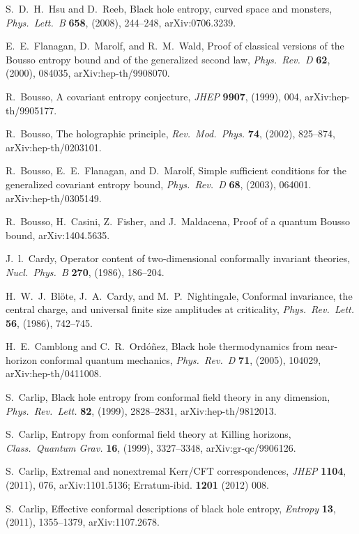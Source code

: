\documentclass[11pt]{article}
\begin{document}
\begin{thebibliography}{999}
 S.~D.~H.\ Hsu and D.\ Reeb, Black hole entropy, 
curved space and monsters, \emph{Phys.\ Lett.\ B} {\bf 658}, 
(2008), 244--248, arXiv:0706.3239. 

 E.~E.\ Flanagan, D.\ Marolf, and R.~M.\ Wald,
Proof of classical versions of the Bousso entropy bound and of the 
generalized second law, \emph{Phys.\ Rev.\ D} {\bf 62}, (2000),
084035, arXiv:hep-th/9908070.

 R.\ Bousso, A covariant entropy conjecture,
\emph{JHEP} {\bf 9907}, (1999), 004, arXiv:hep-th/9905177.

 R.\ Bousso, The holographic principle, 
\emph{Rev.\ Mod.\ Phys.} {\bf 74}, (2002),  825--874, 
arXiv:hep-th/0203101.

 R.\ Bousso, E.~E.\ Flanagan, and D.\ Marolf,
Simple sufficient conditions for the generalized covariant 
entropy bound, \emph{Phys.\ Rev.\ D} {\bf 68}, (2003), 064001.
arXiv:hep-th/0305149.

 R.\ Bousso, H.\ Casini, Z.\ Fisher, and 
J.\ Maldacena, Proof of a quantum Bousso bound, arXiv:1404.5635.

 J.~l.\ Cardy, Operator content of two-dimensional 
conformally invariant theories, \emph{Nucl.\ Phys.\ B} {\bf 270}, 
(1986), 186--204.

  H.~W.~J.\ Bl{\"o}te, J.~A.\ Cardy, and M.~P.\ 
Nightingale, Conformal invariance, the central charge, and 
universal finite size amplitudes at criticality, \emph{Phys.\ Rev.\ 
Lett.} {\bf 56}, (1986), 742--745.

 H.~E.\ Camblong and C.~R.\ Ord{\'o}{\~n}ez, 
Black hole thermodynamics from near-horizon conformal quantum 
mechanics, \emph{Phys.\ Rev.\ D} {\bf 71}, (2005), 104029,
arXiv:hep-th/0411008.

 S.\ Carlip, Black hole entropy from conformal 
field theory in any dimension, \emph{Phys.\ Rev.\ Lett.} {\bf 82}, 
(1999), 2828--2831, arXiv:hep-th/9812013.

 S.\ Carlip, Entropy from conformal field 
theory at Killing horizons, \emph{Class.\ Quantum Grav.} {\bf 16}, 
(1999), 3327--3348, arXiv:gr-qc/9906126.

 S.\ Carlip, Extremal and nonextremal Kerr/CFT 
correspondences, \emph{JHEP} {\bf 1104}, (2011), 076, 
arXiv:1101.5136;  Erratum-ibid. {\bf 1201} (2012) 008.

 S.\ Carlip, Effective conformal descriptions
of black hole entropy, \emph{Entropy} {\bf 13}, (2011), 
1355--1379, arXiv:1107.2678. 


\end{thebibliography}
\end{document}
